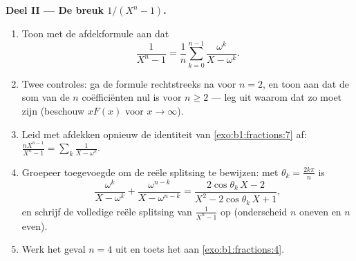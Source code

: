 \begin{problem}
\medskip
\noindent\textbf{Deel II --- De breuk $1/(X^n - 1)$.}
\begin{enumerate}[resume]
  \item Toon met de afdekformule aan dat
        \[
        \frac{1}{X^n - 1}
        = \frac1n\sum_{k=0}^{n-1}\frac{\omega^k}{X - \omega^k} .
        \]
  \item Twee controles: ga de formule rechtstreeks na voor $n = 2$, en
        toon aan dat de som van de $n$ coëfficiënten nul is voor $n \geq
        2$ --- leg uit waarom dat zo moet zijn (beschouw $xF(x)$ voor $x
        \to \infty$).
  \item Leid met afdekken opnieuw de identiteit van
        \cref{exo:b1:fractions:7} af: $\frac{nX^{n-1}}{X^n-1} = \sum_k
        \frac1{X - \omega^k}$.
  \item Groepeer toegevoegde  om de reële splitsing te bewijzen:
        met $\theta_k = \frac{2k\pi}n$ is
        \[
        \frac{\omega^k}{X - \omega^k} +
        \frac{\omega^{n-k}}{X - \omega^{n-k}}
        = \frac{2\cos\theta_k\,X - 2}
        {X^2 - 2\cos\theta_k\,X + 1} ,
        \]
        en schrijf de volledige reële splitsing van $\frac1{X^n-1}$ op
        (onderscheid $n$ oneven en $n$ even).
  \item Werk het geval $n = 4$ uit en toets het aan
        \cref{exo:b1:fractions:4}.
\end{enumerate}


\end{problem}
